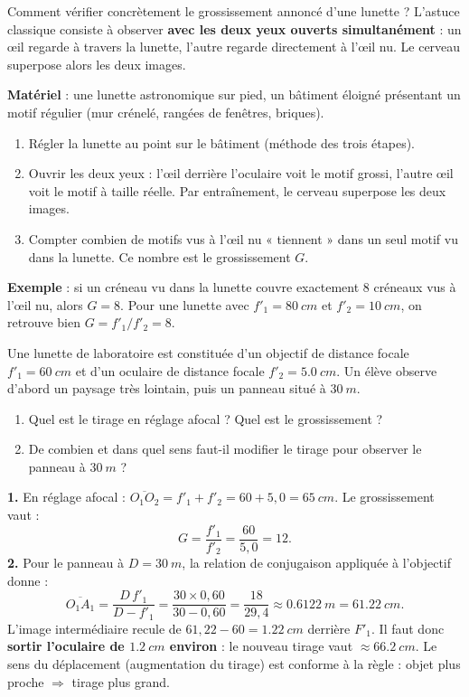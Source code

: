 \documentclass[11pt]{article}
\begin{document}
Comment vérifier concrètement le grossissement annoncé d'une lunette ? L'astuce classique consiste à observer \textbf{avec les deux yeux ouverts simultanément} : un œil regarde à travers la lunette, l'autre regarde directement à l'œil nu. Le cerveau superpose alors les deux images.

\begin{experience}
\textbf{Matériel} : une lunette astronomique sur pied, un bâtiment éloigné présentant un motif régulier (mur crénelé, rangées de fenêtres, briques).
\begin{enumerate}
\item Régler la lunette au point sur le bâtiment (méthode des trois étapes).
\item Ouvrir les deux yeux : l'œil derrière l'oculaire voit le motif grossi, l'autre œil voit le motif à taille réelle. Par entraînement, le cerveau superpose les deux images.
\item Compter combien de motifs vus à l'œil nu « tiennent » dans un seul motif vu dans la lunette. Ce nombre est le grossissement $G$.
\end{enumerate}
\textbf{Exemple} : si un créneau vu dans la lunette couvre exactement 8 créneaux vus à l'œil nu, alors $G = 8$. Pour une lunette avec $f'_1 = \SI{80}{cm}$ et $f'_2 = \SI{10}{cm}$, on retrouve bien $G = f'_1/f'_2 = 8$.
\end{experience}

\begin{exoresolu}
Une lunette de laboratoire est constituée d'un objectif de distance focale $f'_1 = \SI{60}{cm}$ et d'un oculaire de distance focale $f'_2 = \SI{5,0}{cm}$. Un élève observe d'abord un paysage très lointain, puis un panneau situé à $\SI{30}{m}$.
\begin{enumerate}
\item Quel est le tirage en réglage afocal ? Quel est le grossissement ?
\item De combien et dans quel sens faut-il modifier le tirage pour observer le panneau à $\SI{30}{m}$ ?
\end{enumerate}
\tcblower
\textbf{1.} En réglage afocal : $\overline{O_1O_2} = f'_1 + f'_2 = 60 + 5{,}0 = \SI{65}{cm}$. Le grossissement vaut :
\[ G = \frac{f'_1}{f'_2} = \frac{60}{5{,}0} = 12. \]
\textbf{2.} Pour le panneau à $D = \SI{30}{m}$, la relation de conjugaison appliquée à l'objectif donne :
\[ \overline{O_1A_1} = \frac{D\, f'_1}{D - f'_1} = \frac{30 \times 0{,}60}{30 - 0{,}60} = \frac{18}{29{,}4} \approx \SI{0,6122}{m} = \SI{61,22}{cm}. \]
L'image intermédiaire recule de $61{,}22 - 60 = \SI{1,22}{cm}$ derrière $F'_1$. Il faut donc \textbf{sortir l'oculaire de $\SI{1,2}{cm}$ environ} : le nouveau tirage vaut $\approx \SI{66,2}{cm}$. Le sens du déplacement (augmentation du tirage) est conforme à la règle : objet plus proche $\Rightarrow$ tirage plus grand.
\end{exoresolu}
\end{document}
